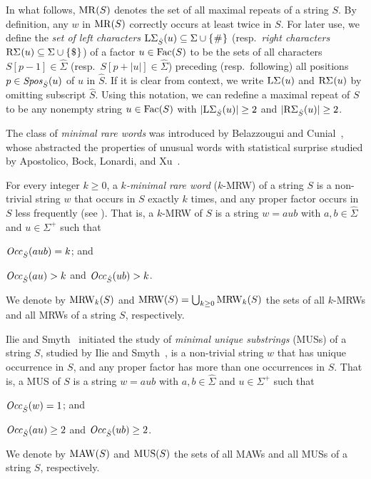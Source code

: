 In what follows, $\MR(S)$ denotes the set of all maximal repeats of a string $S$. By definition, any $w$ in $\MR(S)$ correctly occurs at least twice in $S$. 
For later use, we define the \textit{set of left characters} $\LSigma(u) \subseteq \Sigma\cup\set{\#}$ (resp.~\textit{right characters} $\RSigma[](u) \subseteq \Sigma\cup\set{\daller}$) of a factor $u \in \Fac(S)$ to be the sets of all characters $S[p-1] \in \hat\Sigma$ (resp.~$S[p+|u|] \in \hat\Sigma$) preceding (resp.~following) all positions $p\in \Spos(u)$ of $u$ in $\hat S$.
If it is clear from context, we write $\LSigma[](u)$ and $\RSigma[](u)$ by omitting subscript $\hat S$. 
Using this notation, we can redefine a maximal repeat of $S$ to be any nonempty string $u \in \Fac(S)$ with $|\LSigma(u)| \ge 2$ and $|\RSigma(u)| \ge 2$.


The class of \textit{minimal rare words} was introduced by Belazzougui and Cunial~\cite{belazzougui2015space:unusual}, whose abstracted the properties of unusual words with statistical surprise studied by Apostolico, Bock, Lonardi, and Xu~\cite{apostolico2000efficient}.

\begin{definition}\rm 
For every integer $k\ge 0$, a \textit{$k$-minimal rare word} ($k$-MRW) of a string $S$ is a non-trivial string $w$ that occurs in $S$ exactly $k$ times, and any proper factor occurs in $S$ less frequently (see \cite{belazzougui2015space:unusual}). That is, a $k$-MRW of $S$ is a string $w = a u b$ with $a, b\in \hat\Sigma$ and $u \in \Sigma^+$ such that
\begin{enumerate*}[(i)]
\item $\Occ(aub) = k$; and 
\item $\Occ(au) > k$ and $\Occ(ub) > k$. 
\end{enumerate*}
We denote by $\MRW_k(S)$ and $\MRW(S) = \bigcup_{k\ge 0} \MRW_k(S)$ the sets of all $k$-MRWs and all MRWs of a string $S$, respectively.
\end{definition}

Ilie and Smyth~\cite{ilie2011minimum} initiated the study of \textit{minimal unique substrings} (MUSs) of a string $S$, studied by Ilie and Smyth~\cite{ilie2011minimum}, is a non-trivial string $w$ that has unique occurrence in $S$, and any proper factor has more than one occurrences in $S$. 
That is, a MUS of $S$ is a string $w = a u b$ with $a, b\in \hat\Sigma$ and $u \in \Sigma^+$ such that
\begin{enumerate*}[(i)]
\item $\Occ(w) = 1$; and 
\item $\Occ(au) \ge 2$ and $\Occ(ub) \ge 2$. 
\end{enumerate*}
We denote by $\MAW(S)$ and $\MUS(S)$ the sets of all MAWs and all MUSs of a string $S$, respectively. 


